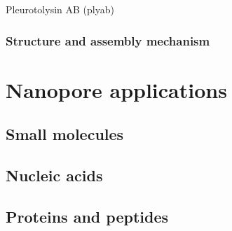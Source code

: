 Pleurotolysin AB (\gls{plyab})

\subsubsection{Structure and assembly mechanism}




%
%
\section{Nanopore applications}

\subsection{Small molecules}

\subsection{Nucleic acids }

\subsection{Proteins and peptides}








\cleardoublepage

